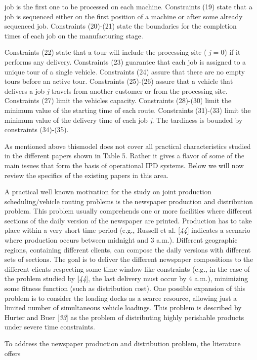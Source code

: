  job is the first one to be processed on each machine. Constraints (19) state that a
 job is sequenced either on the first position of a machine or after some already
 sequenced job. Constraints (20)-(21) state the
 boundaries for the completion times of each job on the manufacturing stage.\par Constraints (22) state that a tour
 will include the processing site ( \textit{j} = 0) if it performs any
 delivery. Constraints (23) guarantee
 that each job is assigned to a unique tour of a single vehicle. Constraints (24) assure that there are no empty tours
 before an active tour. Constraints (25)-(26) assure that a
 vehicle that delivers a job \textit{j} travels from another customer or from
 the processing site. Constraints (27)
 limit the vehicles capacity. Constraints (28)-(30) limit the minimum
 value of the starting time of each route. Constraints (31)-(33) limit
 the minimum value of the delivery time of each job \textit{j}. The tardiness
 is bounded by constraints (34)-(35).\par As mentioned above thismodel does not cover all practical characteristics studied in
 the different papers shown in Table 5. Rather
 it gives a flavor of some of the main issues that form the basis of operational IPD
 systems. Below we will now review the specifics of the existing papers in this
 area.\par A practical well known motivation for the study on joint production
 scheduling/vehicle routing problems is the newspaper production and distribution
 problem. This problem usually comprehends one or more facilities where different
 sections of the daily version of the newspaper are printed. Production has to take
 place within a very short time period (e.g., Russell et al. [\textit{44}] indicates a scenario where production occurs between midnight
 and 3 a.m.). Different geographic regions, containing different clients, can compose
 the daily versions with different sets of sections. The goal is to deliver the
 different newspaper compositions to the different clients respecting some time
 window-like constraints (e.g., in the case of the problem studied by [\textit{44}], the last delivery must occur by 4 a.m.),
 minimizing some fitness function (such as distribution cost). One possible expansion
 of this problem is to consider the loading docks as a scarce resource, allowing just
 a limited number of simultaneous vehicle loadings. This problem is described by
 Hurter and Buer [\textit{33}] as the problem of
 distributing highly perishable products under severe time constraints.\par To address the newspaper production and distribution problem, the literature offers
